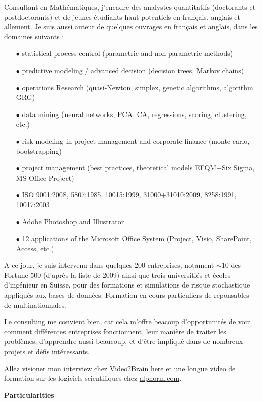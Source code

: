 	Consultant en Mathématiques, j'encadre des analystes quantitatifs (doctorants et postdoctorants) et de jeunes étudiants haut-potentiels en français, anglais et allement. Je suis aussi auteur de quelques ouvrages en français et anglais, dans les domaines suivants :
	\pagebreak
	\begin{itemize}	 
		\item[$\bullet$] statistical process control (parametric and non-parametric methods)
		\item[$\bullet$] predictive modeling / advanced decision (decision trees, Markov chains)
		\item[$\bullet$] operations Research (quasi-Newton, simplex, genetic algorithms, algorithm GRG)
		\item[$\bullet$] data mining (neural networks, PCA, CA, regressions, scoring, clustering, etc.)
		\item[$\bullet$] risk modeling in project management and corporate finance (monte carlo, bootstrapping)
		\item[$\bullet$] project management (best practices, theoretical models EFQM+Six Sigma, MS Office Project)
		\item[$\bullet$] ISO 9001:2008, 5807:1985, 10015:1999, 31000+31010:2009, 8258:1991, 10017:2003
		\item[$\bullet$] Adobe Photoshop and Illustrator
		\item[$\bullet$] 12 applications of the Microsoft Office System (Project, Visio, SharePoint, Access, etc.)
	\end{itemize}
	A ce jour, je suis intervenu dans quelques 200 entreprises, notament $\sim$10 des Fortune 500 (d'après la liste de 2009) ainsi que trois universitiés et écoles d'ingénieur en Suisse, pour des formations et simulations de risque stochastique appliqués aux bases de données. Formation en cours particuliers de reponsables de multinationnales.

	Le consulting me convient bien, car cela m'offre beacoup d'opportunités de voir comment différentes entreprises fonctionnent, leur manière de traiter les problèmes, d'apprendre aussi beaucoup, et d'être impliqué dans de nombreux projets et défis intéressants.

	Allez visioner mon interview chez Video2Brain \href{http://www.youtube.com/watch?v=nOYwENyVPJQ}{{\color{blue}here}} et une longue video de formation sur les logiciels scientifiques chez \href{http://www.alphorm.com}{{\color{blue}alphorm.com}}.

\textbf{Particularities}	

